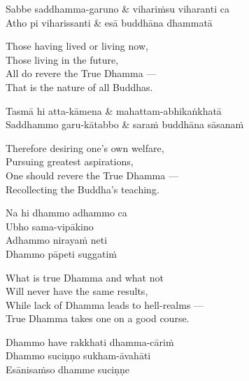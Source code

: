 \begin{twochants}
  Sabbe saddhamma-garuno & vihariṁsu viharanti ca \\
  Atho pi viharissanti & esā buddhāna dhammatā \\
\end{twochants}

\begin{english}
  Those having lived or living now,\\
  Those living in the future,\\
  All do revere the True Dhamma ---\\
  That is the nature of all Buddhas.
\end{english}

\begin{twochants}
  Tasmā hi atta-kāmena & mahattam-abhikaṅkhatā \\
  Saddhammo garu-kātabbo & saraṁ buddhāna sāsanaṁ \\
\end{twochants}

\begin{english}
  Therefore desiring one's own welfare,\\
  Pursuing greatest aspirations,\\
  One should revere the True Dhamma ---\\
  Recollecting the Buddha's teaching.
\end{english}


\begin{paritta}
Na hi dhammo adhammo ca\\
Ubho sama-vipākino \\
Adhammo nirayaṁ neti\\
Dhammo pāpeti suggatiṁ
\end{paritta}

\begin{english}
  What is true Dhamma and what not\\
  Will never have the same results,\\
  While lack of Dhamma leads to hell-realms ---\\
  True Dhamma takes one on a good course.
\end{english}

\begin{paritta}
Dhammo have rakkhati dhamma-cāriṁ\\
Dhammo suciṇṇo sukham-āvahāti\\
Esānisaṁso dhamme suciṇṇe
\end{paritta}


